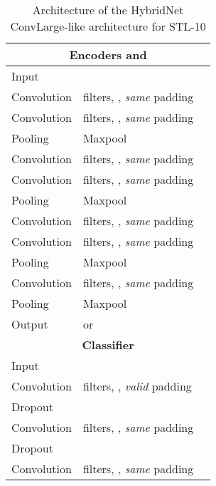 \documentclass[runningheads]{llncs}
\begin{document}
 \begin{table}[htbp]
\centering
\caption{Architecture of the HybridNet ConvLarge-like architecture for STL-10}
\label{tab:convlargestl}
\begin{threeparttable}
\setlength{\tabcolsep}{4pt}
\begin{tabular}{ l l l}
\toprule
\multicolumn{3}{c}{\textbf{Encoders  and }} \\
\midrule
Input &  &  \\
Convolution &  filters, , \textit{same} padding &  \\
Convolution &  filters, , \textit{same} padding &  \\
Pooling   & Maxpool  &  \\

Convolution &  filters, , \textit{same} padding &  \\
Convolution &  filters, , \textit{same} padding &  \\
Pooling   & Maxpool  &  \\

Convolution &  filters, , \textit{same} padding  &  \\
Convolution &  filters, , \textit{same} padding  &  \\
Pooling   & Maxpool  &  \\

Convolution &  filters, , \textit{same} padding  &  \\
Pooling & Maxpool   &  \\

Output &  or  &  \\

\toprule
\multicolumn{3}{c}{\textbf{Classifier }}\\
\midrule
Input & &  \\

Convolution &  filters, , \textit{valid} padding  &  \\
Dropout &   &  \\
Convolution &  filters, , \textit{same} padding &  \\
Dropout &   &  \\
Convolution &  filters, , \textit{same} padding &  \\


\end{tabular}
\end{threeparttable}
\end{table}
\end{document}
